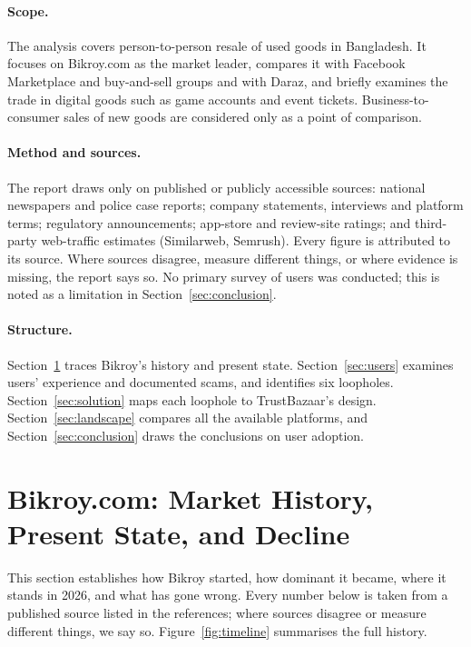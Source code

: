 \documentclass[11pt,a4paper]{article}
\begin{document}
\paragraph{Scope.} The analysis covers person-to-person resale of used goods in Bangladesh.
It focuses on Bikroy.com as the market leader, compares it with Facebook Marketplace and
buy-and-sell groups and with Daraz, and briefly examines the trade in digital goods such as
game accounts and event tickets. Business-to-consumer sales of new goods are considered only
as a point of comparison.

\paragraph{Method and sources.} The report draws only on published or publicly accessible
sources: national newspapers and police case reports; company statements, interviews and
platform terms; regulatory announcements; app-store and review-site ratings; and third-party
web-traffic estimates (Similarweb, Semrush). Every figure is attributed to its source. Where
sources disagree, measure different things, or where evidence is missing, the report says so.
No primary survey of users was conducted; this is noted as a limitation in
Section~\ref{sec:conclusion}.

\paragraph{Structure.} Section~\ref{sec:history} traces Bikroy's history and present state.
Section~\ref{sec:users} examines users' experience and documented scams, and identifies six
loopholes. Section~\ref{sec:solution} maps each loophole to TrustBazaar's design.
Section~\ref{sec:landscape} compares all the available platforms, and
Section~\ref{sec:conclusion} draws the conclusions on user adoption.

\section{Bikroy.com: Market History, Present State, and Decline}
\label{sec:history}

This section establishes how Bikroy started, how dominant it became, where it stands in 2026,
and what has gone wrong. Every number below is taken from a published source listed in the
references; where sources disagree or measure different things, we say so.
Figure~\ref{fig:timeline} summarises the full history.
\end{document}
